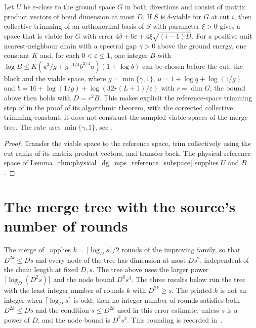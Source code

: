 \begin{lemma}
    \label{thm:physical_dg_collective_trimming}
    \leanok
    Let $U$ be $\varepsilon$-close to the ground space $G$ in both
    directions and consist of matrix product vectors of bond dimension at
    most $D$. If $S$ is $\delta$-viable for $G$ at cut $i$, then collective
    trimming of an orthonormal basis of $S$ with parameter $\xi>0$ gives a
    space that is viable for $G$ with error
    $4\delta+6\varepsilon+4\xi\sqrt{(i-1)D}$.
    For a positive unit nearest-neighbour chain with a spectral gap
    $\gamma>0$ above the ground energy, one constant $K$ and, for each
    $0<\varepsilon\le1$, one integer $B$ with
    $\log B\le K(u^3/g+g^{-1/4}b^{3/4}u)(1+\log b)$ can be chosen before
    the cut, the block and the viable space, where $g=\min\{\gamma,1\}$,
    $u=1+\log q+\log(1/g)$ and
    $b=16+\log(1/g)+\log(32r(L+1)/\varepsilon)$ with $r=\dim G$; the
    bound above then holds with $D=r^2B$.
    This makes explicit the reference-space trimming step of
    \cite{Arad2016RigorousRG} in the proof of its algorithmic theorem, with the corrected
    collective trimming constant; it does not construct the sampled viable
    spaces of the merge tree. The rate uses $\min\{\gamma,1\}$, see
    \cite{gap:alvv16_approximation_parameters}.
\end{lemma}
\begin{proof}\leanok
    Transfer the viable space to the reference space, trim collectively
    using the cut ranks of its matrix product vectors, and transfer back.
    The physical reference space of
    Lemma~\ref{thm:physical_dg_mps_reference_subspace} supplies $U$ and
    $B$.
\end{proof}

\section{The merge tree with the source's number of rounds}

The merge of~\cite[Theorem~\texttt{t:alg1}, lines 1777--1818]{Arad2016RigorousRG}
applies $k=\lceil\log_Ds\rceil/2$ rounds of the improving family, so that
$D^{2k}\le Ds$ and every node of the tree has dimension at most $Ds^2$,
independent of the chain length at fixed $D,s$. The tree above uses the larger power
$\lceil\log_D(D^2s)\rceil$ and the node bound $D^6s^3$. The three results below
run the tree with the least integer number of rounds $k$ with $D^{2k}\ge s$.
The printed $k$ is not an integer when $\lceil\log_Ds\rceil$ is odd; then no
integer number of rounds satisfies both $D^{2k}\le Ds$ and the condition
$s\le D^{2k}$ used in this error estimate, unless $s$ is a power of $D$, and the
node bound is $D^2s^2$. This rounding is recorded
in~\cite{gap:alvv16_approximation_parameters}.

